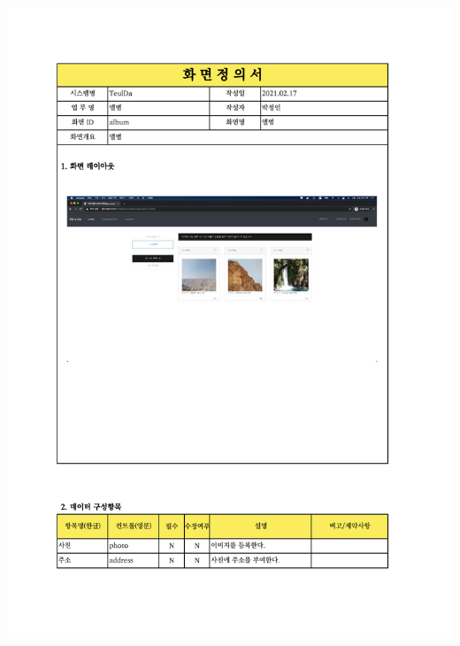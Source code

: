 {{{{{{{{{{{{{{{{{{{{{{{{{{{{{{{{{{{{{{{{{{{{{{{\includegraphics[width=20cm]{./Figure/Design/Display/photo/photo_03.pdf} \\
}}}}}}}}}}}}}}}}}}}}}}}}}}}}}}}}}}}}}}}}}}}}}}}
